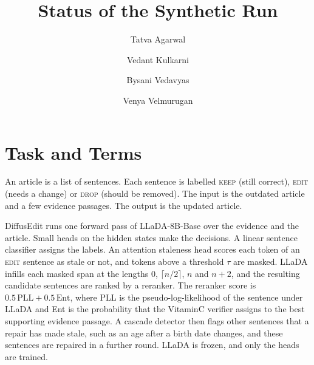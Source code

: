 \documentclass[]{paper}
\newcommand{\keep}{\textsc{keep}}
\newcommand{\edit}{\textsc{edit}}
\newcommand{\drop}{\textsc{drop}}
\begin{document}
\title{Status of the Synthetic Run}

\author[*]{Tatva Agarwal}
\author[*]{Vedant Kulkarni}
\author[*]{Bysani Vedavyas}
\author[*]{Venya Velmurugan}




\date{}

\maketitle{}


\section{Task and Terms}

An article is a list of sentences. Each sentence is labelled \keep{} (still correct), \edit{} (needs a change) or \drop{} (should be removed). The input is the outdated article and a few evidence passages. The output is the updated article.

DiffusEdit runs one forward pass of LLaDA-8B-Base over the evidence and the article. Small heads on the hidden states make the decisions. A linear sentence classifier assigns the labels. An attention staleness head scores each token of an \edit{} sentence as stale or not, and tokens above a threshold $\tau$ are masked. LLaDA infills each masked span at the lengths $0$, $\lceil n/2 \rceil$, $n$ and $n+2$, and the resulting candidate sentences are ranked by a reranker. The reranker score is $0.5\,\mathrm{PLL} + 0.5\,\mathrm{Ent}$, where PLL is the pseudo-log-likelihood of the sentence under LLaDA and Ent is the probability that the VitaminC verifier assigns to the best supporting evidence passage. A cascade detector then flags other sentences that a repair has made stale, such as an age after a birth date changes, and these sentences are repaired in a further round. LLaDA is frozen, and only the heads are trained.
\end{document}
